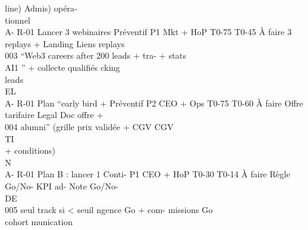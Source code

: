 \documentclass[12pt,landscape,a4paper]{article}
\begin{document}
line)                                                                Admis) opéra-\\
tionnel\\
A- R-01    Lancer 3 webinaires Préventif P1   Mkt + HoP    T0-75 T0-45 À faire   3 replays +   Landing Liens replays\\
003        “Web3 careers after                                                   200 leads     + tra-  + stats\\
AI1 ” + collecte                                                      qualifiés     cking\\
leads\\
\vspace{0.5em}
\vspace{0.5em}
\vspace{0.5em}
\vspace{0.5em}
EL\\
A- R-01    Plan “early bird + Préventif P2    CEO + Ops    T0-75 T0-60 À faire   Offre tarifaire Legal     Doc offre +\\
004        alumni” (grille prix                                                  validée + CGV             CGV\\
\vspace{0.5em}
\vspace{0.5em}
\vspace{0.5em}
\vspace{0.5em}
TI\\
+ conditions)\\
\vspace{0.5em}
\vspace{0.5em}
\vspace{0.5em}
\vspace{0.5em}
N\\
A- R-01    Plan B : lancer 1     Conti-  P1   CEO + HoP    T0-30 T0-14 À faire   Règle Go/No- KPI ad- Note Go/No-\\
\vspace{0.5em}
\vspace{0.5em}
\vspace{0.5em}
\vspace{0.5em}
DE\\
005        seul track si \textless{} seuil ngence                                          Go + com-      missions Go\\
cohort                                                                munication\\
\vspace{0.5em}
\vspace{0.5em}
\end{document}
